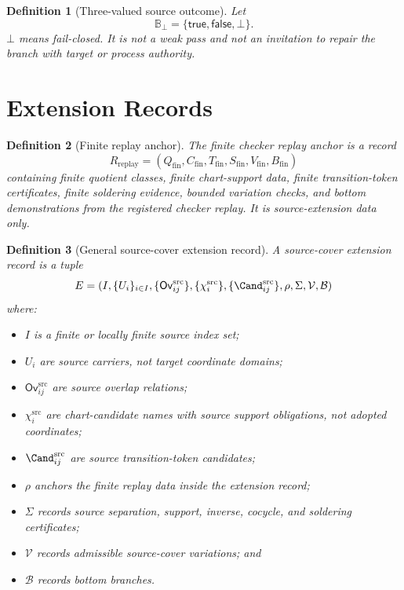 \documentclass[11pt]{article}
\newcommand{\Bot}{\bot}
\newtheorem{definition}{Definition}
\begin{document}
\begin{definition}[Three-valued source outcome]
Let
\[
  \mathbb{B}_{\Bot}=\{\mathsf{true},\mathsf{false},\Bot\}.
\]
\(\Bot\) means fail-closed. It is not a weak pass and not an invitation to
repair the branch with target or process authority.
\end{definition}

\section{Extension Records}

\begin{definition}[Finite replay anchor]
The finite checker replay anchor is a record
\[
  R_{\mathrm{replay}} =
  (Q_{\mathrm{fin}}, C_{\mathrm{fin}}, T_{\mathrm{fin}},
   S_{\mathrm{fin}}, V_{\mathrm{fin}}, B_{\mathrm{fin}})
\]
containing finite quotient classes, finite chart-support data, finite
transition-token certificates, finite soldering evidence, bounded variation
checks, and bottom demonstrations from the registered checker replay. It is
source-extension data only.
\end{definition}

\begin{definition}[General source-cover extension record]
A source-cover extension record is a tuple
\[
  E =
  (I,\{U_i\}_{i\in I},\{\mathsf{Ov}^{\mathrm{src}}_{ij}\},
   \{\chi_i^{\mathrm{src}}\},\{\Cand_{ij}^{\mathrm{src}}\},
   \rho,\Sigma,\mathcal{V},\mathcal{B})
\]
where:
\begin{itemize}
  \item \(I\) is a finite or locally finite source index set;
  \item \(U_i\) are source carriers, not target coordinate domains;
  \item \(\mathsf{Ov}^{\mathrm{src}}_{ij}\) are source overlap relations;
  \item \(\chi_i^{\mathrm{src}}\) are chart-candidate names with source
        support obligations, not adopted coordinates;
  \item \(\Cand_{ij}^{\mathrm{src}}\) are source transition-token candidates;
  \item \(\rho\) anchors the finite replay data inside the extension record;
  \item \(\Sigma\) records source separation, support, inverse, cocycle,
        and soldering certificates;
  \item \(\mathcal{V}\) records admissible source-cover variations; and
  \item \(\mathcal{B}\) records bottom branches.
\end{itemize}
\end{definition}
\end{document}
